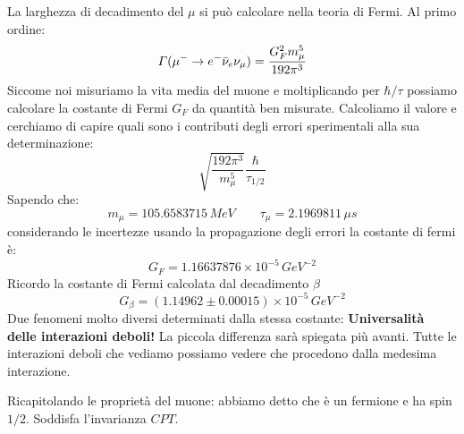 La larghezza di decadimento del $\mu$ si può calcolare nella teoria di Fermi. Al primo ordine:
\begin{equation*}
    \Gamma(\mu^-\to e^-\Bar{\nu}_e\nu_\mu)=\frac{G_F^2m_\mu^5}{192\pi^3}
\end{equation*}
Siccome noi misuriamo la vita media del muone e moltiplicando per $\hbar/\tau$ possiamo calcolare la costante di Fermi $G_F$ da quantità ben misurate. Calcoliamo il valore e cerchiamo di capire quali sono i contributi degli errori sperimentali alla sua determinazione:
\begin{equation*}
    \sqrt{\frac{192\pi^3}{m_\mu^5}}\frac{\hbar}{\tau_{1/2}}
\end{equation*}
Sapendo che:
\begin{equation*}
    m_\mu=105.6583715\,MeV \qquad \tau_\mu=2.1969811\,\mu s
\end{equation*}
considerando le incertezze usando la propagazione degli errori la costante di fermi è:
\begin{equation*}
    G_F=1.16637876\times10^{-5}\,GeV^{-2}
\end{equation*}
Ricordo la costante di Fermi calcolata dal decadimento $\beta$
\begin{equation*}
    G_\beta=(1.14962\pm0.00015)\times10^{-5}\,GeV^{-2}
\end{equation*}
Due fenomeni molto diversi determinati dalla stessa costante: \textbf{Universalità delle interazioni deboli!} La piccola differenza sarà spiegata più avanti. Tutte le interazioni deboli che vediamo possiamo vedere che procedono dalla medesima interazione.

Ricapitolando le proprietà del muone: abbiamo detto che è un fermione e ha spin $1/2$. Soddisfa l'invarianza $CPT$.
